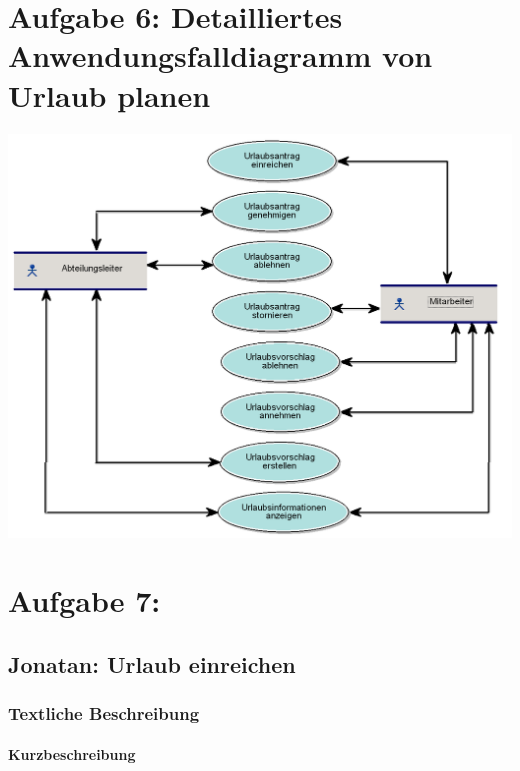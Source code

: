 \chapter*{Aufgabe 6: Detailliertes Anwendungsfalldiagramm von Urlaub planen}
\setcounter{section}{0}
\addtocounter{chapter}{1}

\begin{center}
	\includegraphics[scale=0.4]{UrlaubPlanen_AWF.PNG}
\end{center}

\chapter*{Aufgabe 7:}
\setcounter{section}{0}
\addtocounter{chapter}{1}

\section{Jonatan: Urlaub einreichen}

\subsection{Textliche Beschreibung}

\subsubsection{Kurzbeschreibung}

